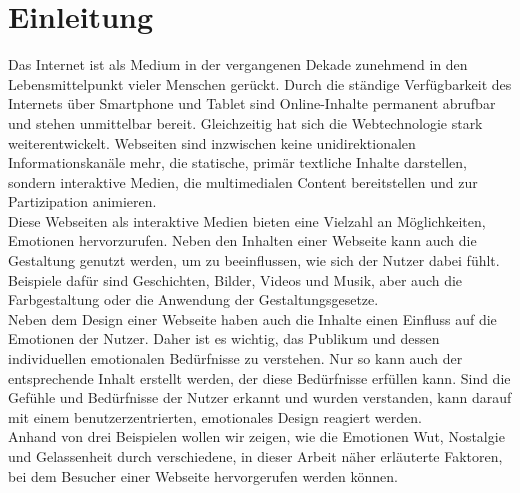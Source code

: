 \documentclass[./dokumentation.tex]{subfiles}
\begin{document}
\chapter{Einleitung}

Das Internet ist als Medium in der vergangenen Dekade zunehmend in den Lebensmittelpunkt vieler Menschen gerückt. Durch die ständige Verfügbarkeit des Internets über Smartphone und Tablet sind Online-Inhalte permanent abrufbar und stehen unmittelbar bereit. Gleichzeitig hat sich die Webtechnologie stark weiterentwickelt. Webseiten sind inzwischen keine unidirektionalen Informationskanäle mehr, die statische, primär textliche Inhalte darstellen, sondern interaktive Medien, die multimedialen Content bereitstellen und zur Partizipation animieren.\\

Diese Webseiten als interaktive Medien bieten eine Vielzahl an Möglichkeiten, Emotionen hervorzurufen. Neben den Inhalten einer Webseite kann auch die Gestaltung genutzt werden, um zu beeinflussen, wie sich der Nutzer dabei fühlt. Beispiele dafür sind Geschichten, Bilder, Videos und Musik, aber auch die Farbgestaltung oder die Anwendung der Gestaltungsgesetze.\\
Neben dem Design einer Webseite haben auch die Inhalte einen Einfluss auf die Emotionen der Nutzer. Daher ist es wichtig, das Publikum und dessen individuellen emotionalen Bedürfnisse zu verstehen. Nur so kann auch der entsprechende Inhalt erstellt werden, der diese Bedürfnisse erfüllen kann. Sind die Gefühle und Bedürfnisse der Nutzer erkannt und wurden verstanden, kann darauf mit einem benutzerzentrierten, emotionales Design reagiert werden.\\

Anhand von drei Beispielen wollen wir zeigen, wie die Emotionen Wut, Nostalgie und Gelassenheit durch verschiedene, in dieser Arbeit näher erläuterte Faktoren, bei dem Besucher einer Webseite hervorgerufen werden können.\\
\end{document}
